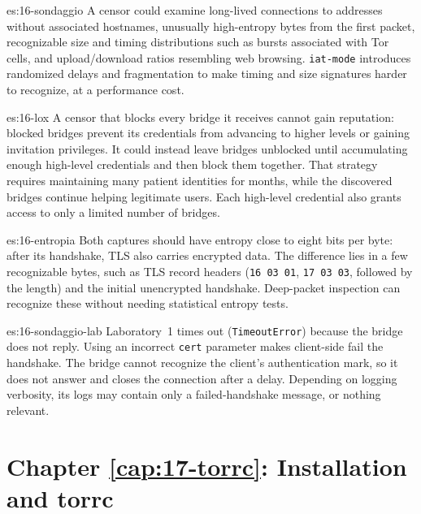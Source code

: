 \begin{soluzione}{es:16-sondaggio}
A censor could examine long-lived connections to addresses without associated hostnames, unusually high-entropy bytes from the first packet, recognizable size and timing distributions such as bursts associated with Tor cells, and upload/download ratios resembling web browsing. \texttt{iat-mode} introduces randomized delays and fragmentation to make timing and size signatures harder to recognize, at a performance cost.
\end{soluzione}

\begin{soluzione}{es:16-lox}
A censor that blocks every bridge it receives cannot gain reputation: blocked bridges prevent its credentials from advancing to higher levels or gaining invitation privileges. It could instead leave bridges unblocked until accumulating enough high-level credentials and then block them together. That strategy requires maintaining many patient identities for months, while the discovered bridges continue helping legitimate users. Each high-level credential also grants access to only a limited number of bridges.
\end{soluzione}

\begin{soluzione}{es:16-entropia}
Both captures should have entropy close to eight bits per byte: after its handshake, TLS also carries encrypted data. The difference lies in a few recognizable bytes, such as TLS record headers (\texttt{16 03 01}, \texttt{17 03 03}, followed by the length) and the initial unencrypted handshake. Deep-packet inspection can recognize these without needing statistical entropy tests.
\end{soluzione}

\begin{soluzione}{es:16-sondaggio-lab}
Laboratory~1 times out (\texttt{TimeoutError}) because the bridge does not reply. Using an incorrect \texttt{cert} parameter makes client-side  fail the handshake. The bridge cannot recognize the client's authentication mark, so it does not answer and closes the connection after a delay. Depending on logging verbosity, its logs may contain only a failed-handshake message, or nothing relevant.
\end{soluzione}

\section*{Chapter \ref{cap:17-torrc}: Installation and torrc}

